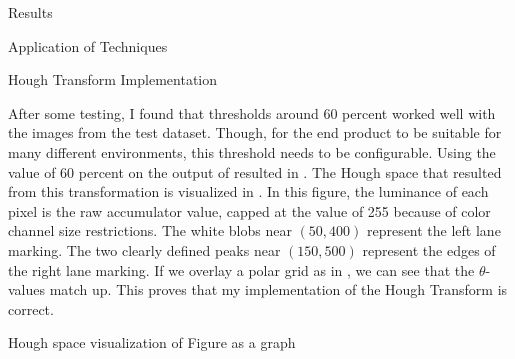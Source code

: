 \documentclass{matthijs}
\begin{document}
\begin{hoofdstuk}{Results}
\begin{paragraaf}{Application of Techniques}
\begin{subparagraaf}{Hough Transform Implementation}
				\bigskip

				After some testing, I found that thresholds around 60 percent worked well with the images from the test dataset.
				Though, for the end product to be suitable for many different environments, this threshold needs to be configurable.
				Using the value of 60 percent on the output of  resulted in .
				The Hough space that resulted from this transformation is visualized in .
				In this figure, the luminance of each pixel is the raw accumulator value, capped at the value of 255 because of color channel size restrictions.
				The white blobs near $(50,400)$ represent the left lane marking.
				The two clearly defined peaks near $(150,500)$ represent the edges of the right lane marking.
				If we overlay a polar grid as in , we can see that the $\theta$-values match up.
				This proves that my implementation of the Hough Transform is correct.

				\begin{figuur}{Hough space visualization of Figure  as a graph}

\end{figuur}
\end{subparagraaf}
\end{paragraaf}
\end{hoofdstuk}
\end{document}
